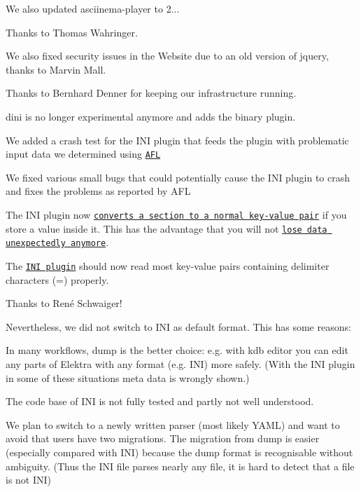 We also updated asciinema-\/player to 2...

Thanks to Thomas Wahringer.

We also fixed security issues in the Website due to an old version of jquery, thanks to Marvin Mall.

Thanks to Bernhard Denner for keeping our infrastructure running.


\begin{DoxyItemize}
\item {\ttfamily dini} is no longer experimental anymore and adds the binary plugin.
\item We added a crash test for the I\+NI plugin that feeds the plugin with problematic input data we determined using \href{http://lcamtuf.coredump.cx/afl}{\tt A\+FL}
\item We fixed various small bugs that could potentially cause the I\+NI plugin to crash and fixes the problems as reported by A\+FL
\item The I\+NI plugin now \href{https://github.com/ElektraInitiative/libelektra/issues/1793}{\tt converts a section to a normal key-\/value pair} if you store a value inside it. This has the advantage that you will not \href{https://github.com/ElektraInitiative/libelektra/issues/1697}{\tt lose data unexpectedly anymore}.
\item The \href{https://www.libelektra.org/plugins/ini}{\tt I\+NI plugin} should now read most key-\/value pairs containing delimiter characters ({\ttfamily =}) properly.
\end{DoxyItemize}

Thanks to René Schwaiger!

Nevertheless, we did not switch to I\+NI as default format. This has some reasons\+:


\begin{DoxyItemize}
\item In many workflows, {\ttfamily dump} is the better choice\+: e.\+g. with {\ttfamily kdb editor} you can edit any parts of Elektra with any format (e.\+g. I\+NI) more safely. (With the I\+NI plugin in some of these situations meta data is wrongly shown.)
\item The code base of I\+NI is not fully tested and partly not well understood.
\item We plan to switch to a newly written parser (most likely Y\+A\+ML) and want to avoid that users have two migrations. The migration from {\ttfamily dump} is easier (especially compared with I\+NI) because the {\ttfamily dump} format is recognisable without ambiguity. (Thus the I\+NI file parses nearly any file, it is hard to detect that a file is not I\+NI)
\end{DoxyItemize}

